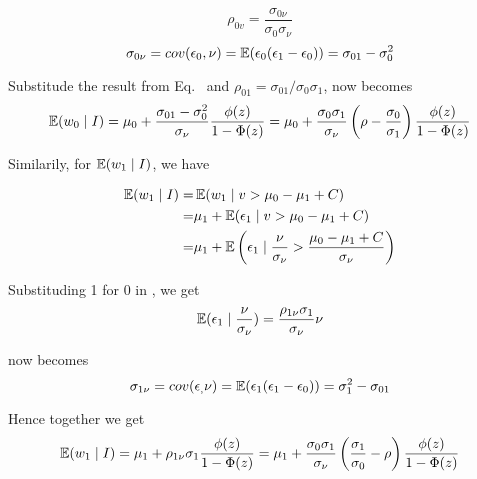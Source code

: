 \begin{equation*}
    \rho_{0v} = \frac{\sigma_{0\nu}}{\sigma_0\sigma_\nu}
\end{equation*}
\begin{equation}
    \label{eq:cov_0_nu}
    \sigma_{0\nu}=cov(\epsilon_0, \nu)=\operatorname{\mathbb{E}}(\epsilon_0 (\epsilon_1 - \epsilon_0)) = \sigma_{01}-\sigma_0^2
\end{equation}

Substitude the result from Eq.~ and $\rho_{01}=\sigma_{01}/\sigma_0\sigma_1$, 
 now becomes
\begin{equation}
    \label{eq:E_0_I}
    \operatorname{\mathbb{E}}(w_{0} \mid I) = 
    \mu_0 + \frac{\sigma_{01}-\sigma_0^2}{\sigma_\nu} \frac{\phi(z)}{1-\Phi(z)}
    =\mu_0 + \frac{\sigma_0 \sigma_1}{\sigma_\nu}\left(
        \rho - \frac{\sigma_0}{\sigma_1}
    \right)\frac{\phi(z)}{1-\Phi(z)}
\end{equation}

Similarily, for $\operatorname{\mathbb{E}}(w_1 \mid I)$, we have

\begin{align*}
    \operatorname{\mathbb{E}}(w_{1} \mid I) =& \operatorname{\mathbb{E}}(w_{1} \mid v > \mu_0 - \mu_1 + C)  \\
    =& \mu_1 + \operatorname{\mathbb{E}}(\epsilon_1 \mid  v > \mu_0 - \mu_1 + C )  \\
    =& \mu_1 + \operatorname{\mathbb{E}} \left(
            \epsilon_1 \mid \frac{\nu}{\sigma_\nu} > \frac{\mu_0 - \mu_1 + C}{\sigma_\nu}
            \right)
\end{align*}

Substituding 1 for 0 in , we get
\begin{equation}
    \label{eq:biv_normal_exp_1}
    \operatorname{\mathbb{E}}(\epsilon_1 \mid \frac{\nu}{\sigma_\nu})
    =\frac{\rho_{1\nu}\sigma_1}{\sigma_\nu}\nu
\end{equation}

 now becomes
\begin{equation}
    \label{eq:cov_1_nu}
    \sigma_{1\nu}=cov(\epsilon_, \nu)=
    \operatorname{\mathbb{E}}(\epsilon_1 (\epsilon_1 - \epsilon_0)) = \sigma_{1}^2-\sigma_{01}
\end{equation}

Hence together we get
\begin{equation}
    \label{eq:E_1_I}
    \operatorname{\mathbb{E}}(w_{1} \mid I) = 
    \mu_1 + \rho_{1\nu}\sigma_1 \frac{\phi(z)}{1-\Phi(z)}
    =\mu_1 + \frac{\sigma_0 \sigma_1}{\sigma_\nu}\left(
        \frac{\sigma_1}{\sigma_0} - \rho
    \right)\frac{\phi(z)}{1-\Phi(z)}
\end{equation}



